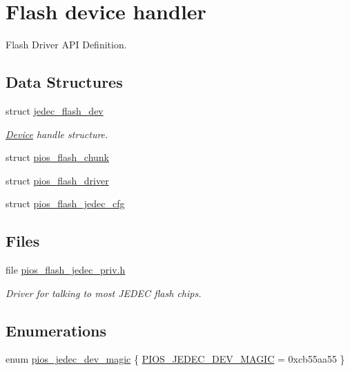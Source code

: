 \hypertarget{group___p_i_o_s___f_l_a_s_h}{\section{\-Flash device handler}
\label{group___p_i_o_s___f_l_a_s_h}
}


\-Flash \-Driver \-A\-P\-I \-Definition.  


\subsection*{\-Data \-Structures}
\begin{DoxyCompactItemize}
\item 
struct \hyperlink{structjedec__flash__dev}{jedec\-\_\-flash\-\_\-dev}
\begin{DoxyCompactList}\small\item\em \hyperlink{struct_device}{\-Device} handle structure. \end{DoxyCompactList}\item 
struct \hyperlink{structpios__flash__chunk}{pios\-\_\-flash\-\_\-chunk}
\item 
struct \hyperlink{structpios__flash__driver}{pios\-\_\-flash\-\_\-driver}
\item 
struct \hyperlink{structpios__flash__jedec__cfg}{pios\-\_\-flash\-\_\-jedec\-\_\-cfg}
\end{DoxyCompactItemize}
\subsection*{\-Files}
\begin{DoxyCompactItemize}
\item 
file \hyperlink{pios__flash__jedec__priv_8h}{pios\-\_\-flash\-\_\-jedec\-\_\-priv.\-h}
\begin{DoxyCompactList}\small\item\em \-Driver for talking to most \-J\-E\-D\-E\-C flash chips. \end{DoxyCompactList}\end{DoxyCompactItemize}
\subsection*{\-Enumerations}
\begin{DoxyCompactItemize}
\item 
enum \hyperlink{group___p_i_o_s___f_l_a_s_h_ga3e7c01370e9757b84f3a37ec903714f3}{pios\-\_\-jedec\-\_\-dev\-\_\-magic} \{ \hyperlink{group___p_i_o_s___f_l_a_s_h_gga3e7c01370e9757b84f3a37ec903714f3a6360375c9264a236124eccd65cf3e519}{\-P\-I\-O\-S\-\_\-\-J\-E\-D\-E\-C\-\_\-\-D\-E\-V\-\_\-\-M\-A\-G\-I\-C} =  0xcb55aa55
 \}
\end{DoxyCompactItemize}
